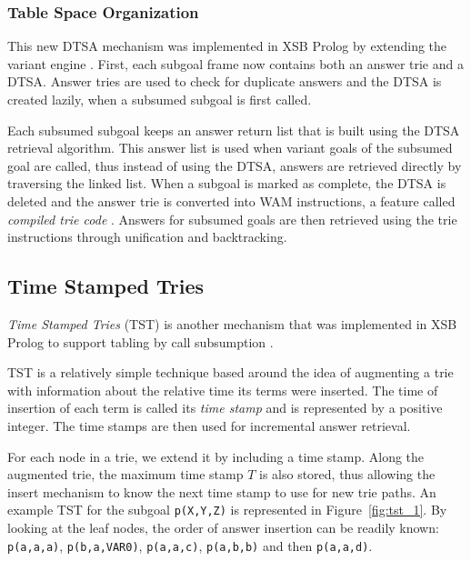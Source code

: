 \subsubsection{Table Space Organization}

This new DTSA mechanism was implemented in XSB Prolog by extending the variant engine \cite{Rao-96}.
First, each subgoal frame now contains both an answer trie and a DTSA.
Answer tries are used to check for duplicate answers and the DTSA is created lazily, when a
subsumed subgoal is first called.

Each subsumed subgoal keeps an answer return list that is built using the DTSA retrieval algorithm.
This answer list is used when variant goals of the subsumed goal are called, thus instead of using
the DTSA, answers are retrieved directly by traversing the linked list.
When a subgoal is marked as complete, the DTSA is deleted and the answer trie is converted into WAM
instructions, a feature called \textit{compiled trie code} \cite{RamakrishnanIV-99}. Answers for
subsumed goals are then retrieved using the trie instructions through unification and backtracking.

\subsection{Time Stamped Tries} \label{sec:time_stamped_tries}

\textit{Time Stamped Tries} (TST) is another mechanism that was implemented in XSB
Prolog to support tabling by call subsumption \cite{Johnson-99}.

TST is a relatively simple technique based around the idea of augmenting a trie with information about the relative time
its terms were inserted. The time of insertion of each term is called its \textit{time stamp} and is represented by a
positive integer. The time stamps are then used for incremental answer retrieval.

For each node in a trie, we extend it by including a time stamp. Along the augmented trie, the maximum time stamp
$T$ is also stored, thus allowing the insert mechanism to know the next time stamp to use for new trie paths.
An example TST for the subgoal \texttt{p(X,Y,Z)} is represented in Figure~\ref{fig:tst_1}.
By looking at the leaf nodes, the order of answer insertion
can be readily known: \texttt{p(a,a,a)}, \texttt{p(b,a,VAR0)}, \texttt{p(a,a,c)}, \texttt{p(a,b,b)} and then
\texttt{p(a,a,d)}.


